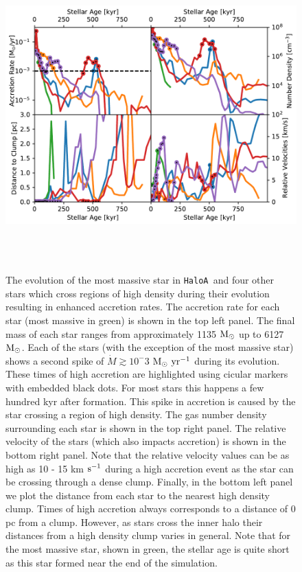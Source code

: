 \documentclass[twocolumn,iop,revtex4]{openjournal}
\newcommand{\kms} {km $\rm{s^{-1}}$}
\newcommand{\msolar} {$\rm{M_{\odot}}~$}
\newcommand{\msolarc} {$\rm{M_{\odot}}$}
\newcommand{\msolaryr} {$\rm{M_{\odot}~yr^{-1}}~$}
\newcommand{\ha} {\texttt{HaloA~}}
\begin{document}
\begin{figure}
\centering
\begin{minipage}{175mm}      \begin{center}
\centerline{
    \includegraphics[width=18.0cm, height=12cm]{FIGURES/MultiplicityPlotsReader.pdf}}
\caption{The evolution of the most massive star in \ha and four other stars which
  cross regions of high density during their evolution resulting in enhanced accretion rates.
  The accretion rate for each star (most massive in green) is shown in the
  top left panel. The final mass of each star ranges from approximately 1135 \msolar up to 6127
  \msolarc. Each of the stars (with the exception of the most massive star) shows a second
  spike of $\dot{M} \gtrsim 10^-3$ \msolaryr during its evolution. These times of high accretion
  are highlighted using cicular markers with embedded black dots. For most stars this
  happens a few hundred kyr after formation. This spike in accretion is caused by the star
  crossing a region of high density.
  The gas number density surrounding each star is shown in the top right panel. The
  relative velocity of the stars (which also impacts accretion) is shown in the bottom
  right panel. Note that the relative velocity values can be as high as 10 - 15 \kms
  during a high accretion event as the star can be crossing through a dense clump.
  Finally, in the bottom left panel we plot the distance from each star to the
  nearest high density clump. Times of high accretion always corresponds to a distance
  of 0 pc from a clump. However, as stars cross the inner halo their distances from a high density
  clump varies in general. Note that for the most massive star, shown in green, the stellar
  age is quite short as this star formed near the end of the simulation.}
\label{Fig:Clumps}
\end{center} \end{minipage}
\end{figure}
\end{document}
